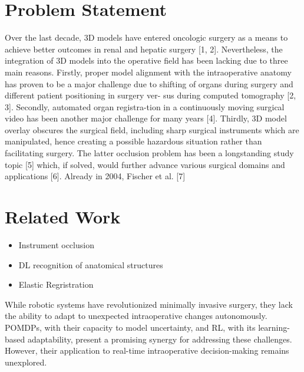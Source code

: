 \documentclass[12pt,a4paper]{article}
\begin{document}
\section{Problem Statement}
Over the last decade, 3D models have entered oncologic surgery
as a means to achieve better outcomes in renal and hepatic
surgery [1, 2]. Nevertheless, the integration of 3D models into
the operative field has been lacking due to three main reasons.
Firstly, proper model alignment with the intraoperative anatomy
has proven to be a major challenge due to shifting of organs
during surgery and different patient positioning in surgery ver-
sus during computed tomography [2, 3]. Secondly, automated
organ registra-tion in a continuously moving surgical video
has been another major challenge for many years [4]. Thirdly,
3D model overlay obscures the surgical field, including sharp
surgical instruments which are manipulated, hence creating a
possible hazardous situation rather than facilitating surgery. The
latter occlusion problem has been a longstanding study topic
[5] which, if solved, would further advance various surgical
domains and applications [6]. Already in 2004, Fischer et al. [7]

\section{Related Work}
\begin{itemize}
    \item Instrument occlusion
    \item DL recognition of anatomical structures
    \item Elastic Regristration
\end{itemize}

While robotic systems have revolutionized minimally invasive surgery, they lack the 
ability to adapt to unexpected intraoperative changes autonomously. POMDPs, with 
their capacity to model uncertainty, and RL, with its learning-based adaptability, 
present a promising synergy for addressing these challenges. However, their 
application to real-time intraoperative decision-making remains unexplored.
\end{document}
